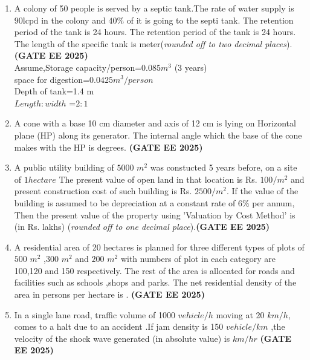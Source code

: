 \documentclass[journal,12pt,onecolumn]{IEEEtran}
\theoremstyle{remark}
\begin{document}
\begin{enumerate}
\begin{enumerate}
 \end{enumerate}
 \item A colony of 50 people is served by a septic tank.The rate of water supply is $90\text{lcpd}$ in the colony and $40\%$ of it is going to the septi tank. The retention period of the tank is 24 hours. The retention period of the tank is 24 hours. The length of the specific tank is \underline{\makebox[2cm]{\hfill}} meter(\textit{rounded off to two decimal places}).\hfill \textbf{(GATE EE 2025)}\\
 Assume,Storage capacity/person=$0.085 m^3$ (3 years)\\
 space for digestion=$0.0425 m^3/person$\\
 Depth of tank=1.4 m\\
 $Length:width$ =$2:1$\\
 \item A cone with a base 10 cm diameter and axis of 12 cm is lying on Horizontal plane (HP) along its generator. The internal angle which the base of the cone makes with the HP is \underline{\makebox[2cm]{\hfill}} degrees. \hfill \textbf{(GATE EE 2025)}\\
 \item A public utility building of $5000$ ${m^2}$ was constucted 5 years before, on a site of $1 hectare$ The present value of open land in that location is Rs. $100/m^2$ and present construction cost of such building is Rs. $2500/m^2$. If the value of the building is assumed to be depreciation at a constant rate of $6\%$ per annum, Then the present value of the property using 'Valuation by Cost Method' is \underline{\makebox[2cm]{\hfill}} (in Rs. lakhs) (\textit{rounded off to one decimal place}).\hfill \textbf{(GATE EE 2025)}\\
 \item A residential area of 20 hectares is planned for three different types of plots of $500$ ${m^2}$ ,$300$ $m^2$ and $200$ $m^2$ with numbers of plot in each category are 100,120 and 150 respectively. The rest of the area is allocated for roads and facilities such as schools ,shops and parks. The net residential density of the area in persons per hectare is \underline{\makebox[2cm]{\hfill}}. \hfill \textbf{(GATE EE 2025)}
 \item In a single lane road, traffic volume of 1000 $vehicle/h$ moving at 20 $km/h$, comes to a halt due to an accident .If  jam density is 150 $vehicle/km$ ,the velocity of the shock wave generated (in absolute value) is \underline{\makebox[2cm]{\hfill}} $km/hr$ \hfill \textbf{(GATE EE 2025)}

\end{enumerate}
\end{document}
